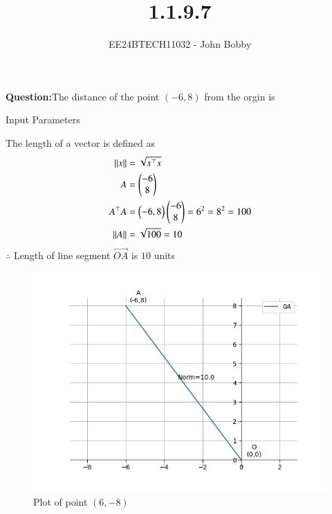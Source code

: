 \documentclass[journal]{IEEEtran}
\begin{document}

\vspace{3cm}
\title{1.1.9.7}
\author{EE24BTECH11032 - John Bobby}
{\let\newpage\relax\maketitle}

\renewcommand{\thefigure}{\theenumi}
\renewcommand{\thetable}{\theenumi}
\setlength{\intextsep}{10pt} %


\renewcommand{\thetable}{\theenumi}


\textbf{Question:}The distance of the point $(-6,8)$ from the orgin is\\
\begin{table}[h!]    
  \centering
  
  \caption{Input Parameters}
  \label{tab1.1.9.7}
\end{table}
\solution The length of a vector is defined as\\
\begin{align}
	\left\lVert x\right\rVert &= \sqrt{x^\top x}\\
	A &=\begin{pmatrix}-6\\8\end{pmatrix} \\
	A^\top A &=\begin{pmatrix}-6, 8\end{pmatrix}\begin{pmatrix}-6\\8\end{pmatrix} = 6^2=8^2=100\\
	\left\lVert A\right\rVert &= \sqrt{100}=10
\end{align}
$\therefore$ Length of line segment $\vec{OA}$ is $10$ units
\begin{figure}[h!]
                \centering
               \includegraphics[width=0.7\linewidth]{Figs/Fig1.png}
			\caption{Plot of point $(6,-8)$}
               \label{stemplot}
               \end{figure}
\end{document}

